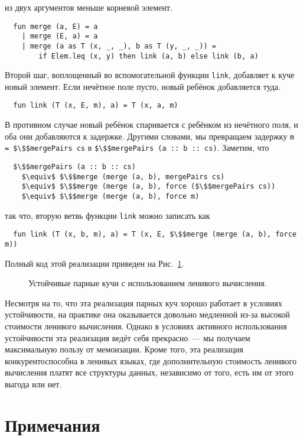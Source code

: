 из двух аргументов меньше корневой элемент.
\begin{lstlisting}
  fun merge (a, E) = a
    | merge (E, a) = a
    | merge (a as T (x, _, _), b as T (y, _, _)) =
        if Elem.leq (x, y) then link (a, b) else link (b, a)
\end{lstlisting}
Второй шаг, воплощенный во вспомогательной функции \lstinline!link!,
добавляет к куче новый элемент. Если нечётное поле пусто, новый
ребёнок добавляется туда.
\begin{lstlisting}
  fun link (T (x, E, m), a) = T (x, a, m)
\end{lstlisting}
В противном случае новый ребёнок спаривается с ребёнком из нечётного
поля, и оба они добавляются к задержке. Другими словами, мы превращаем
задержку \lstinline!m = $\$$mergePairs cs! в 
\lstinline!$\$$mergePairs (a :: b :: cs)!. Заметим, что
\begin{lstlisting}
  $\$$mergePairs (a :: b :: cs)
    $\equiv$ $\$$merge (merge (a, b), mergePairs cs)
    $\equiv$ $\$$merge (merge (a, b), force ($\$$mergePairs cs))
    $\equiv$ $\$$merge (merge (a, b), force m)
\end{lstlisting}
так что, вторую ветвь функции \lstinline!link! можно записать как
\begin{lstlisting}
  fun link (T (x, b, m), a) = T (x, E, $\$$merge (merge (a, b), force m))
\end{lstlisting}
Полный код этой реализации приведен на Рис.~\ref{fig:6.6}.

\begin{figure}
  \centering
  
  \caption{Устойчивые парные кучи с использованием ленивого вычисления.}
  \label{fig:6.6}
\end{figure}

\begin{hint}
  Несмотря на то, что эта реализация парных куч хорошо работает в условиях
  устойчивости, на практике она оказывается довольно
  медленной из-за высокой стоимости ленивого вычисления. Однако в
  условиях активного использования устойчивости эта реализация
  ведёт себя прекрасно~--- мы получаем максимальную пользу от
  мемоизации. Кроме того, эта реализация конкурентоспособна в ленивых
  языках, где дополнительную стоимость ленивого вычисления платят все
  структуры данных, независимо от того, есть им от этого выгода или нет.
\end{hint}

\section{Примечания}
\label{sc:6.6}

